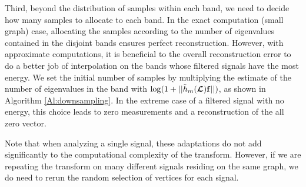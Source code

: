 \documentclass[journal, 10pt]{IEEEtran}
\begin{document}
Third, beyond the distribution of samples within each band, we need to decide how many samples to allocate to each band. In the exact computation (small graph) case, allocating the samples according to the number of eigenvalues contained in the disjoint bands ensures perfect reconstruction. However, with approximate computations, it is beneficial to the overall reconstruction error to do a better job of interpolation on the bands whose filtered signals have the most energy. %
We set the initial number of samples by multiplying the estimate of the number of eigenvalues in the band with $\log(1+||\tilde{h}_m(\boldsymbol{\mathcal{L}}){\bf f}||)$, as shown in Algorithm \ref{Al:downsampling}. In the extreme case of a filtered signal with no energy, this choice leads to zero measurements and a reconstruction of the all zero vector.






Note that when analyzing a single signal, these adaptations do not add significantly to the computational complexity of the transform. However, if we are repeating the transform on many different signals residing on the same graph, we do need to rerun the random selection of vertices for each signal.






\end{document}
